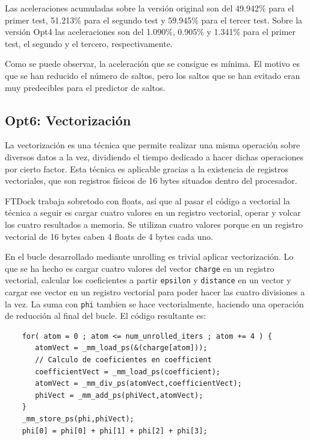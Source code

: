 Las aceleraciones acumuladas sobre la versi\'{o}n original son del 49.942\% para el
primer test, 51.213\% para el segundo test y 59.945\% para el tercer test. Sobre
la versi\'{o}n Opt4 las aceleraciones son del 1.090\%, 0.905\% y 1.341\% para el
primer test, el segundo y el tercero, respectivamente.

Como se puede observar, la aceleraci\'{o}n que se consigue es m\'{i}nima. El
motivo es que se han reducido el n\'{u}mero de saltos, pero los saltos que se han
evitado eran muy predecibles para el predictor de saltos.

\subsection{Opt6: Vectorizaci\'{o}n}

La vectorizaci\'{o}n es una t\'{e}cnica que permite realizar una misma
operaci\'{o}n sobre diversos datos a la vez, dividiendo el tiempo dedicado a
hacer dichas operaciones por cierto factor. Esta t\'{e}cnica es aplicable
gracias a la existencia de registros vectoriales, que son registros f\'{i}sicos
de 16 bytes situados dentro del procesador.

FTDock trabaja sobretodo con floats, as\'{i} que al pasar el c\'{o}digo a vectorial
la t\'{e}cnica a seguir es cargar cuatro valores en un registro vectorial,
operar y volcar los cuatro resultados a memoria. Se utilizan cuatro valores
porque en un registro vectorial de 16 bytes caben 4 floats de 4 bytes cada uno.

En el bucle desarrollado mediante unrolling es trivial aplicar vectorizaci\'{o}n.
Lo que se ha hecho es cargar cuatro valores del vector \texttt{charge} en un
registro vectorial, calcular los coeficientes a partir \texttt{epsilon} y
\texttt{distance} en un vector y cargar ese vector en un registro vectorial para
poder hacer las cuatro divisiones a la vez. La suma con \texttt{phi} tambien se
hace vectorialmente, haciendo una operaci\'{o}n de reducci\'{o}n al final del
bucle. El c\'{o}digo resultante es:

\begin{lstlisting}
    for( atom = 0 ; atom <= num_unrolled_iters ; atom += 4 ) {
       atomVect = _mm_load_ps(&(charge[atom]));
       // Calculo de coeficientes en coefficient
       coefficientVect = _mm_load_ps(coefficient);
       atomVect = _mm_div_ps(atomVect,coefficientVect);
       phiVect = _mm_add_ps(phiVect,atomVect);
    }
    _mm_store_ps(phi,phiVect);
    phi[0] = phi[0] + phi[1] + phi[2] + phi[3];
\end{lstlisting}


